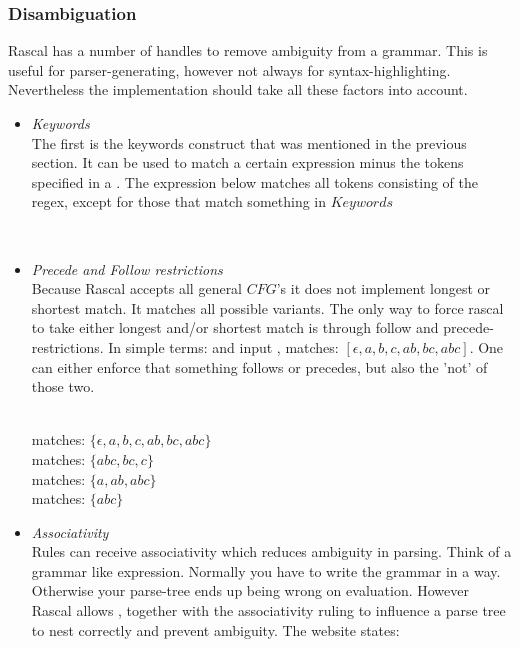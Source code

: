 	\subsubsection{Disambiguation}
	Rascal has a number of handles to remove ambiguity from a grammar. This is useful for parser-generating, however not always for syntax-highlighting. Nevertheless the implementation should take all these factors into account. 
		\begin{itemize}
			\item \emph{Keywords}\\
			The first is the keywords construct that was mentioned in the previous section. It can be used to match a certain expression minus the tokens specified in a . The expression below matches all tokens consisting of the regex, except for those that match something in $Keywords$
			\begin{flushleft}
				\\
			\end{flushleft}
			\item \emph{Precede and Follow restrictions}\\
			Because Rascal accepts all general $CFG$'s it does not implement longest or shortest match. It matches all possible variants. The only way to force rascal to take either longest and/or shortest match is through follow and precede-restrictions. In simple terms: \gram{[a-z]*} and input , matches: $[\epsilon, a, b, c, ab, bc, abc]$. One can either enforce that something follows or precedes, but also the 'not' of those two.
			\begin{flushleft}
				\gram{input = 'abc'}
				\\						\hfill 	matches: $\{\epsilon, a, b, c, ab, bc, abc\}$
				\\ 			\hfill 	matches: $\{abc, bc, c\}$
				\\ 			\hfill 	matches: $\{a, ab, abc\}$
				\\ 	\hfill 	matches: $\{abc\}$
			\end{flushleft}
			\item \emph{Associativity}\\
			Rules can receive associativity which reduces ambiguity in parsing. Think of a grammar like expression. Normally you have to write the grammar in a  way. Otherwise your parse-tree ends up being wrong on evaluation. However Rascal allows , together with the associativity ruling to influence a parse tree to nest correctly and prevent ambiguity. The website states:

\end{itemize}
